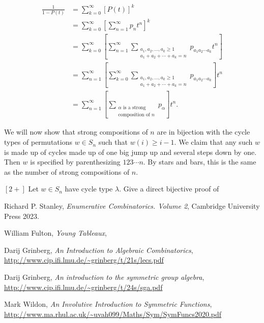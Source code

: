 \documentclass{article}
\begin{document}
\begin{align*}
    \frac{1}{1-P(t)} &= \sum_{k=0}^\infty[P(t)]^k \\
                     &= \sum_{k=0}^\infty \left[\sum_{n=1}^\infty p_nt^n\right]^k \\
                     &= \sum_{k=0}^\infty \left[\sum_{n=1}^\infty\sum_{\substack{a_1,a_2,\ldots,a_k \geq 1 \\ a_1+a_2+\cdots+a_k = n}} p_{a_1a_2\cdots a_k}t^n\right] \\
                     &= \sum_{n=1}^\infty \left[\sum_{k=0}^\infty\sum_{\substack{a_1,a_2,\ldots,a_k \geq 1 \\ a_1+a_2+\cdots+a_k = n}} p_{a_1a_2\cdots a_k}\right]t^n \\
                     &= \sum_{n=1}^\infty \left[\sum_{\substack{\alpha \text{ is a strong} \\ \text{composition of } n}}p_\alpha\right]t^n.
\end{align*}

We will now show that strong compositions of $n$ are in bijection with the cycle types of permutations $w \in S_n$ such that $w(i) \geq i-1$.
We claim that any such $w$ is made up of cycles made up of one big jump up and several steps down by one.
Then $w$ is specified by parenthesizing $123\cdots n$.
By stars and bars, this is the same as the number of strong compositions of $n$.

\begin{exercise}
    $[2+]$
    Let $w \in S_n$ have cycle type $\lambda$. Give a direct bijective proof of 
\end{exercise}

\fi 


\begin{thebibliography}{999999}
    \raggedright\footnotesize

    Richard P. Stanley, 
    \textit{Enumerative Combinatorics. Volume 2}, 
    Cambridge University Press 2023.

    William Fulton, 
    \textit{Young Tableaux}, 

    Darij Grinberg, 
    \textit{An Introduction to Algebraic Combinatorics}, 
    \url{http://www.cip.ifi.lmu.de/~grinberg/t/21s/lecs.pdf}

    Darij Grinberg, 
    \textit{An introduction to the symmetric group algebra}, 
    \url{http://www.cip.ifi.lmu.de/~grinberg/t/24s/sga.pdf}

    Mark Wildon, 
    \textit{An Involutive Introduction to Symmetric Functions},
    \url{http://www.ma.rhul.ac.uk/~uvah099/Maths/Sym/SymFuncs2020.pdf}
\end{thebibliography}
\end{document}
